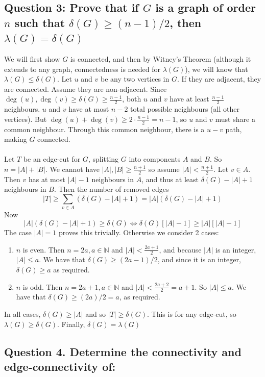 \documentclass[letterpaper, 11pt]{article}
\newcommand{\1}{\mathds{1}}	%
\theoremstyle{definition}
\begin{document}
\subsection*{Question 3: Prove that if $G$ is a graph of order $n$ such that $\delta (G) \ge (n-1)/2$, then $\lambda(G) = \delta(G)$}
We will first show $G$ is connected, and then by Witney's Theorem (although it extends to any graph, connectedness is needed for $\lambda (G)$), we will know that $\lambda(G) \leq \delta(G)$. Let $u$ and $v$ be any two vertices in $G$. If they are adjacent, they are connected. Assume they are non-adjacent. Since $\deg(u), \deg(v) \ge \delta(G) \geq \frac{n-1}{2}$, both $u$ and $v$ have at least $\frac{n-1}{2}$ neighbours. $u$ and $v$ have at most $n-2$ total possible neighbours (all other vertices). But $\deg(u) + \deg(v) \geq 2 \cdot \frac{n-1}{2} = n-1$, so $u$ and $v$ must share a common neighbour. Through this common neighbour, there is a $u-v$ path, making $G$ connected. \\ ~\\ 
Let $T$ be an edge-cut for $G$, splitting $G$ into components $A$ and $B$. So $n = |A| + |B|$. We cannot have $|A|, |B| \ge \frac{n+1}{2}$ so assume $|A| < \frac{n+1}{2}$. Let $v \in A$. Then $v$ has at most $|A|-1$ neighbours in $A$, and thus at least $\delta (G) - |A| + 1$ neighbours in $B$. Then the number of removed edges \[|T| \ge \sum \limits _{v \in A} (\delta (G) - |A| + 1) = |A| (\delta (G) - |A| + 1)\]Now \[
|A|(\delta (G) - |A| + 1) \ge \delta (G) \iff \delta (G) \left [ |A| - 1\right ] \ge |A| \left [ |A| - 1\right ]\] The case $|A| = 1$ proves this trivially. Otherwise we consider 2 cases: 
\begin{enumerate}
	\item $n$ is even. Then $n = 2a, a \in \mathbb{N}$ and $|A| <  \frac{2a + 1}{2}$, and because $|A|$ is an integer, $|A| \le a$. We have that $\delta (G) \ge (2a-1)/2$, and since it is an integer, $\delta (G) \ge a$ as required.
	\item $n$ is odd. Then $n = 2a + 1, a \in \mathbb{N}$ and $|A| < \frac{2a + 2}{2} = a+1$. So $|A| \le a$. We have that $\delta (G) \ge (2a)/2 = a$, as required.
	

\end{enumerate}
In all cases, $\delta (G) \ge |A|$ and so $|T| \ge \delta (G)$. This is for any edge-cut, so $\lambda (G) \ge \delta (G)$. Finally, $\delta (G) = \lambda (G)$ \subsection*{Question 4. Determine the connectivity and edge-connectivity of:}
\end{document}
